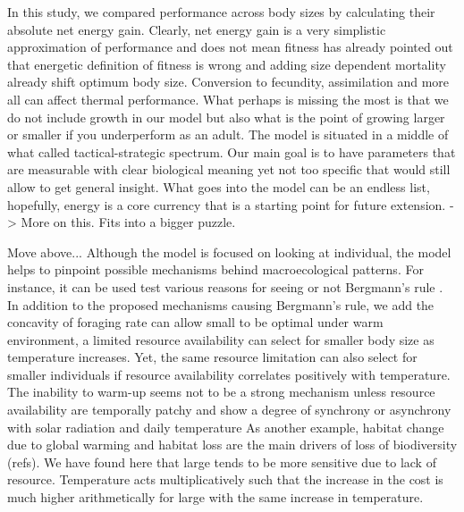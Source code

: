 In this study, we compared performance across body sizes by calculating their absolute net energy gain.
Clearly, net energy gain is a very simplistic approximation of performance and does not mean fitness
\citet{Kozlowski1996} has already pointed out that energetic definition of fitness is wrong and adding size dependent mortality already shift optimum body size.
Conversion to fecundity, assimilation and more all can affect thermal performance.
What perhaps is missing the most is that we do not include growth in our model but also what is the point of growing larger or smaller if you underperform as an adult. 
The model is situated in a middle of what \citet{Holling1966} called tactical-strategic spectrum.
Our main goal is to have parameters that are measurable with clear biological meaning yet not too specific that would still allow to get general insight. 
What goes into the model can be an endless list, hopefully, energy is a core currency that is a starting point for future extension. -> More on this. Fits into a bigger puzzle.

Move above...
Although the model is focused on looking at individual, the model helps to pinpoint possible mechanisms behind macroecological patterns.
For instance, it can be used test various reasons for seeing or not Bergmann's rule \citep{Blackburn1999}.
In addition to the proposed mechanisms causing Bergmann's rule, we add the concavity of foraging rate can allow small to be optimal under warm environment, a limited resource availability can select for smaller body size as temperature increases. 
Yet, the same resource limitation can also select for smaller individuals if resource availability correlates positively with temperature.
The inability to warm-up seems not to be a strong mechanism unless resource availability are temporally patchy and show a degree of synchrony or asynchrony with solar radiation and daily temperature 
As another example, habitat change due to global warming and habitat loss are the main drivers of loss of biodiversity (refs).
We have found here that large tends to be more sensitive due to lack of resource.
Temperature acts multiplicatively such that the increase in the cost is much higher arithmetically for large with the same increase in temperature. %


